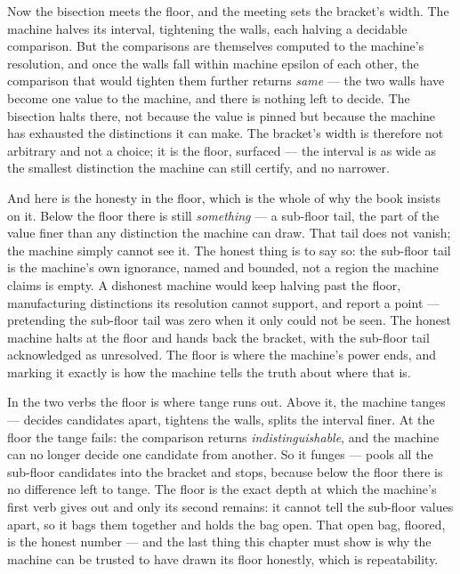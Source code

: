 Now the bisection meets the floor, and the meeting sets the bracket's width. The machine halves its interval, tightening
the walls, each halving a decidable comparison. But the comparisons are themselves computed to the machine's
resolution, and once the walls fall within machine epsilon of each other, the comparison that would tighten them further
returns \emph{same} --- the two walls have become one value to the machine, and there is nothing left to decide. The
bisection halts there, not because the value is pinned but because the machine has exhausted the distinctions it can
make. The bracket's width is therefore not arbitrary and not a choice; it is the floor, surfaced --- the interval is as
wide as the smallest distinction the machine can still certify, and no narrower.

And here is the honesty in the floor, which is the whole of why the book insists on it. Below the floor there is still
\emph{something} --- a sub-floor tail, the part of the value finer than any distinction the machine can draw. That tail
does not vanish; the machine simply cannot see it. The honest thing is to say so: the sub-floor tail is the machine's
own ignorance, named and bounded, not a region the machine claims is empty. A dishonest machine would keep halving past
the floor, manufacturing distinctions its resolution cannot support, and report a point --- pretending the sub-floor
tail was zero when it only could not be seen. The honest machine halts at the floor and hands back the bracket, with the
sub-floor tail acknowledged as unresolved. The floor is where the machine's power ends, and marking it exactly is how
the machine tells the truth about where that is.

In the two verbs the floor is where tange runs out. Above it, the machine tanges --- decides candidates apart, tightens
the walls, splits the interval finer. At the floor the tange fails: the comparison returns \emph{indistinguishable}, and
the machine can no longer decide one candidate from another. So it funges --- pools all the sub-floor candidates into
the bracket and stops, because below the floor there is no difference left to tange. The floor is the exact depth at
which the machine's first verb gives out and only its second remains: it cannot tell the sub-floor values apart, so it
bags them together and holds the bag open. That open bag, floored, is the honest number --- and the last thing this
chapter must show is why the machine can be trusted to have drawn its floor honestly, which is repeatability.

